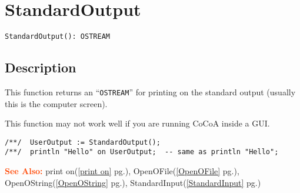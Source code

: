 \documentclass[a4paper]{mybook}
\newenvironment{command}{}{} %
\newcommand\SeeAlso{\par\textcolor{OrangeRed}{\textbf{\large See Also: }}}
\begin{document}
\section{StandardOutput}
\label{StandardOutput}
\begin{command} %


\begin{Verbatim}[label=syntax, rulecolor=\color{MidnightBlue},
frame=single]
StandardOutput(): OSTREAM
\end{Verbatim}


\subsection*{Description}

This function returns an ``\verb&OSTREAM&'' for printing on the standard output
(usually this is the computer screen).
\par 
This function may not work well if you are running CoCoA inside a GUI.
\begin{Verbatim}[label=example, rulecolor=\color{PineGreen}, frame=single]
/**/  UserOutput := StandardOutput();
/**/  println "Hello" on UserOutput;  -- same as println "Hello";
\end{Verbatim}


\SeeAlso %
  print on(\ref{print on} pg.\pageref{print on}), 
    OpenOFile(\ref{OpenOFile} pg.\pageref{OpenOFile}), 
    OpenOString(\ref{OpenOString} pg.\pageref{OpenOString}), 
    StandardInput(\ref{StandardInput} pg.\pageref{StandardInput})
\end{command} %
\end{document}
